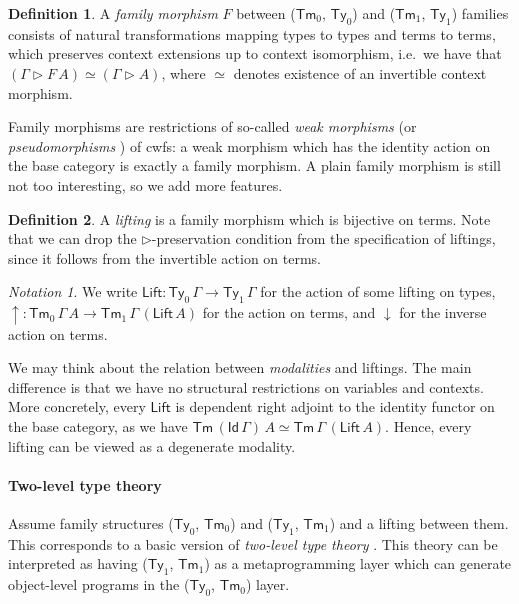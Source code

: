 \documentclass[a4paper,UKenglish,cleveref, autoref, thm-restate]{lipics-v2021}
\theoremstyle{remark}
\newtheorem{notation}{Notation}
\theoremstyle{definition}
\newtheorem{mydefinition}{Definition}
\newcommand{\Ty}{\mathsf{Ty}}
\newcommand{\Tm}{\mathsf{Tm}}
\newcommand{\ext}{\triangleright}
\newcommand{\up}{\uparrow}
\newcommand{\down}{\downarrow}
\newcommand{\Lift}{\mathsf{Lift}}
\newcommand{\msf}[1]{\mathsf{#1}}
\begin{document}
\begin{mydefinition}
A \emph{family morphism} $F$ between ($\Tm_0$, $\Ty_0$) and ($\Tm_1$, $\Ty_1$)
families consists of natural transformations mapping types to types and terms to
terms, which preserves context extensions up to context isomorphism, i.e.\ we
have that $(\Gamma \ext F\,A) \simeq (\Gamma \ext A)$, where $\simeq$ denotes
existence of an invertible context morphism.
\end{mydefinition}

Family morphisms are restrictions of so-called \emph{weak morphisms}
\cite{dependentrightadjoints} (or \emph{pseudomorphisms}
\cite{kaposi2019gluing}) of cwfs: a weak morphism which has the identity action
on the base category is exactly a family morphism. A plain family morphism is
still not too interesting, so we add more features.

\begin{mydefinition}
A \emph{lifting} is a family morphism which is bijective on terms. Note that
we can drop the $\ext$-preservation condition from the specification of
liftings, since it follows from the invertible action on terms.
\end{mydefinition}

\begin{notation}
We write $\Lift : \Ty_0\,\Gamma \to \Ty_1\,\Gamma$ for the action of some lifting
on types, $\up : \Tm_0\,\Gamma\,A \to \Tm_1\,\Gamma\,(\Lift\,A)$ for the action
on terms, and $\down$ for the inverse action on terms.
\end{notation}

We may think about the relation between \emph{modalities} and liftings.  The
main difference is that we have no structural restrictions on variables and
contexts. More concretely, every $\Lift$ is dependent right adjoint
\cite{dependentrightadjoints} to the identity functor on the base category, as
we have $\Tm\,(\msf{Id}\,\Gamma)\,A \simeq \Tm\,\Gamma\,(\Lift\,A)$. Hence,
every lifting can be viewed as a degenerate modality.

\paragraph{Two-level type theory}
Assume family structures ($\Ty_0$, $\Tm_0$) and ($\Ty_1$, $\Tm_1$) and a
lifting between them. This corresponds to a basic version of \emph{two-level
  type theory} \cite{twolevel}. This theory can be interpreted as having ($\Ty_1$,
$\Tm_1$) as a metaprogramming layer which can generate object-level programs in
the ($\Ty_0$, $\Tm_0$) layer.
\end{document}
